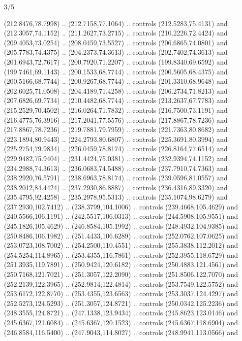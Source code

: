 \begin{flagdescription}{3/5}
\begin{scope}[xshift=0.5\flaglength,yshift=0.5\flagwidth,scale=\flagwidth/270]
\begin{scope}[y=0.8pt, x=0.8pt, yscale=-1,shift={(-281.25,-168.75)}]
  (212.8476,78.7998) .. (212.7158,77.1064) .. controls (212.5283,75.4131) and
  (212.3057,74.1152) .. (211.2627,73.2715) .. controls (210.2226,72.4424) and
  (209.4053,73.0254) .. (208.0459,73.5527) .. controls (206.6865,74.0801) and
  (205.7783,74.4375) .. (204.2373,74.3613) .. controls (202.7402,74.3613) and
  (201.6943,72.7617) .. (200.7920,71.2207) .. controls (199.8340,69.6592) and
  (199.7461,69.1143) .. (200.1533,68.7744) .. controls (200.5605,68.4375) and
  (200.5166,68.7744) .. (200.9267,68.7744) .. controls (201.3310,68.9648) and
  (202.6025,71.0508) .. (204.4189,71.4258) .. controls (206.2734,71.8213) and
  (207.6826,69.7734) .. (210.4482,68.7744) .. controls (213.2637,67.7783) and
  (215.2529,70.4502) .. (216.0264,71.7832) .. controls (216.7500,73.1191) and
  (216.4775,76.3916) .. (217.2041,77.5576) .. controls (217.8867,78.7236) and
  (217.8867,78.7236) .. (219.7881,79.7959) .. controls (221.7363,80.8682) and
  (223.1894,80.9443) .. (224.2793,80.6807) .. controls (225.3691,80.3994) and
  (225.2754,79.9834) .. (226.0459,78.8174) .. controls (226.8164,77.6514) and
  (229.9482,75.9404) .. (231.4424,75.0381) .. controls (232.9394,74.1152) and
  (234.2988,74.3613) .. (236.0683,74.5488) .. controls (237.7910,74.7363) and
  (238.2920,76.5791) .. (238.6963,78.8174) .. controls (239.0596,81.0557) and
  (238.2012,84.4424) .. (237.2930,86.8887) .. controls (236.4316,89.3320) and
  (235.4795,92.4258) .. (235.2978,95.5313) .. controls (235.1074,98.6279) and
  (237.2930,102.7412) .. (238.3799,104.1006) .. controls (239.4668,105.4629) and
  (240.5566,106.1191) .. (242.5517,106.0313) .. controls (244.5908,105.9551) and
  (245.1826,105.4629) .. (246.8584,105.1992) .. controls (248.4932,104.9385) and
  (250.8486,106.1982) .. (251.4433,106.6289) .. controls (252.0762,107.0625) and
  (253.0723,108.7002) .. (254.2500,110.4551) .. controls (255.3838,112.2012) and
  (254.5254,114.8965) .. (253.4355,116.7861) .. controls (252.3955,118.6729) and
  (251.3935,119.7891) .. (250.9424,120.6182) .. controls (250.4883,121.4561) and
  (250.7168,121.7021) .. (251.3057,122.2090) .. controls (251.8506,122.7070) and
  (252.2139,122.3965) .. (252.9814,122.4814) .. controls (253.7549,122.5752) and
  (253.6172,122.8770) .. (253.4355,123.6563) .. controls (253.3037,124.4297) and
  (252.5273,124.5293) .. (251.3057,124.8721) .. controls (250.0342,125.2236) and
  (248.3555,124.8721) .. (247.1338,123.9434) .. controls (245.8623,123.0146) and
  (245.6367,121.6084) .. (245.6367,120.1523) .. controls (245.6367,118.6904) and
  (246.8584,116.5400) .. (247.9043,114.8027) .. controls (248.9941,113.0566) and

\end{scope}
\end{scope}
\end{flagdescription}
